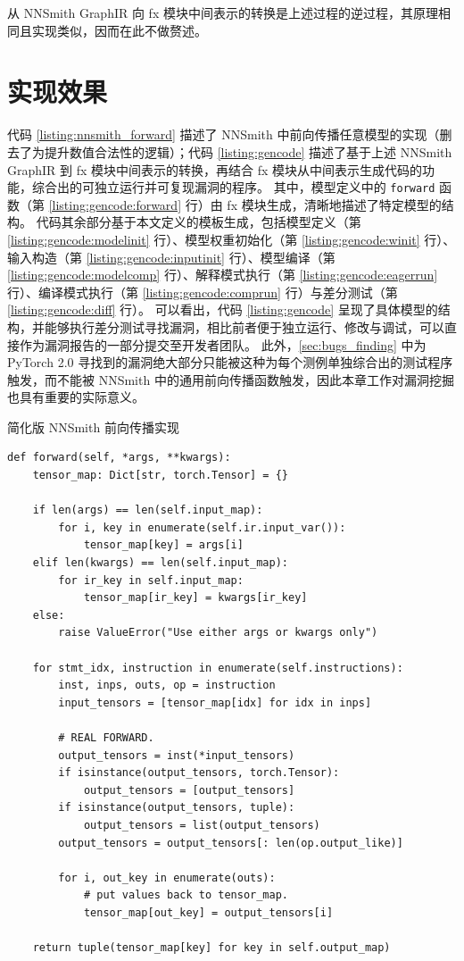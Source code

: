 从 NNSmith GraphIR 向 fx 模块中间表示的转换是上述过程的逆过程，其原理相同且实现类似，因而在此不做赘述。

\section{实现效果}

代码 \ref{listing:nnsmith_forward} 描述了 NNSmith 中前向传播任意模型的实现（删去了为提升数值合法性的逻辑）；代码 \ref{listing:gencode} 描述了基于上述 NNSmith GraphIR 到 fx 模块中间表示的转换，再结合 fx 模块从中间表示生成代码的功能，综合出的可独立运行并可复现漏洞的程序。
其中，模型定义中的 \texttt{forward} 函数（第 \ref{listing:gencode:forward} 行）由 fx 模块生成，清晰地描述了特定模型的结构。
代码其余部分基于本文定义的模板生成，包括模型定义（第 \ref{listing:gencode:modelinit} 行）、模型权重初始化（第 \ref{listing:gencode:winit} 行）、输入构造（第 \ref{listing:gencode:inputinit} 行）、模型编译（第 \ref{listing:gencode:modelcomp} 行）、解释模式执行（第 \ref{listing:gencode:eagerrun} 行）、编译模式执行（第 \ref{listing:gencode:comprun} 行）与差分测试（第 \ref{listing:gencode:diff} 行）。
可以看出，代码 \ref{listing:gencode} 呈现了具体模型的结构，并能够执行差分测试寻找漏洞，相比前者便于独立运行、修改与调试，可以直接作为漏洞报告的一部分提交至开发者团队。
此外，\ref{sec:bugs_finding} 中为 PyTorch 2.0 寻找到的漏洞绝大部分只能被这种为每个测例单独综合出的测试程序触发，而不能被 NNSmith 中的通用前向传播函数触发，因此本章工作对漏洞挖掘也具有重要的实际意义。

\begin{listing}[]
    \caption{简化版 NNSmith 前向传播实现}
    \label{listing:nnsmith_forward}
\begin{verbatim}
def forward(self, *args, **kwargs):
    tensor_map: Dict[str, torch.Tensor] = {}

    if len(args) == len(self.input_map):
        for i, key in enumerate(self.ir.input_var()):
            tensor_map[key] = args[i]
    elif len(kwargs) == len(self.input_map):
        for ir_key in self.input_map:
            tensor_map[ir_key] = kwargs[ir_key]
    else:
        raise ValueError("Use either args or kwargs only")

    for stmt_idx, instruction in enumerate(self.instructions):
        inst, inps, outs, op = instruction
        input_tensors = [tensor_map[idx] for idx in inps]

        # REAL FORWARD.
        output_tensors = inst(*input_tensors)
        if isinstance(output_tensors, torch.Tensor):
            output_tensors = [output_tensors]
        if isinstance(output_tensors, tuple):
            output_tensors = list(output_tensors)
        output_tensors = output_tensors[: len(op.output_like)]

        for i, out_key in enumerate(outs):
            # put values back to tensor_map.
            tensor_map[out_key] = output_tensors[i]
            
    return tuple(tensor_map[key] for key in self.output_map)
\end{verbatim}
\end{listing}

